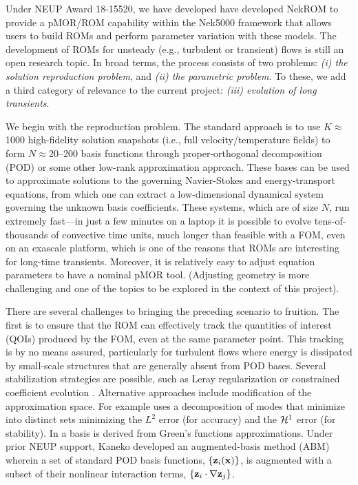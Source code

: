 Under NEUP Award 18-15520, we have developed have developed NekROM to provide a
pMOR/ROM capability within the Nek5000 framework that allows users to build
ROMs and perform parameter variation with these models.  The development of
ROMs for unsteady (e.g., turbulent or transient) flows is still an open
research topic.  In broad terms, the process consists of two problems: {\em (i)
the solution reproduction problem}, and {\em (ii) the parametric problem}.  To
these, we add a third category of relevance to the current project: {\em (iii)
evolution of long transients}.

We begin with the reproduction problem. The standard approach is to use
$K$$\approx$1000 high-fidelity solution snapshots (i.e., full velocity/temperature
fields) to form $N$$\approx$20--200 basis functions through 
proper-orthogonal decomposition (POD) or some other low-rank approximation
approach.  These bases can be used to approximate solutions to the governing
Navier-Stokes and energy-transport equations, from which one can extract a 
low-dimensional dynamical system governing the unknown basis coefficients.  
These systems, which are of size $N$, run extremely fast---in just a few
minutes on a laptop it is possible to evolve tens-of-thousands of convective
time units, much longer than feasible with a FOM, even on an exascale platform,
which is one of the reasons that ROMs are interesting for long-time transients.
Moreover, it is relatively easy to adjust equation parameters to have a nominal
pMOR tool.  (Adjusting geometry is more challenging and one of the topics to be
explored in the context of this project).

There are several challenges to bringing the preceding scenario to fruition.
The first is to ensure that the ROM can effectively track the quantities
of interest (QOIs) produced by the FOM, even at the same parameter point.
This tracking is by no means assured, particularly for turbulent flows
where energy is dissipated by small-scale structures that are generally absent
from POD bases.  Several stabilization strategies are possible, such as Leray
regularization \cite{wang2012proper} or constrained coefficient evolution
\cite{fick}.  Alternative approaches include modification of the approximation
space.  For example \cite{akkari19} uses a decomposition of modes that minimize
into distinct sets minimizing the $L^2$ error (for accuracy) and the ${\cal H}^1$
error (for stability).  In \cite{khodkar2019} a basis is derived from Green's
functions approximations.
   Under prior NEUP support, Kaneko \cite{kaneko22a,kaneko22} developed an
augmented-basis method (ABM) wherein a set of standard POD basis functions,
$\{{\bf z}_i({\bf x}) \}$,  is augmented with a subset of their nonlinear interaction
terms, $\{{\bf z}_i \cdot \nabla {\bf z}_j\}$.   

